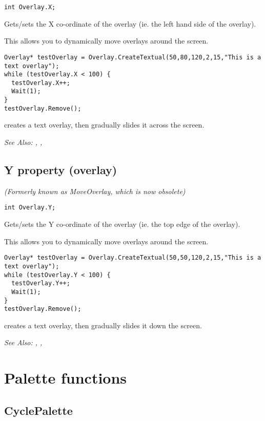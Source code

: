 \begin{verbatim}
int Overlay.X;
\end{verbatim}
Gets/sets the X co-ordinate of the overlay (ie. the left hand side of the overlay).

This allows you to dynamically move overlays around the screen.

\begin{verbatim}
Overlay* testOverlay = Overlay.CreateTextual(50,80,120,2,15,"This is a text overlay");
while (testOverlay.X < 100) {
  testOverlay.X++;
  Wait(1);
}
testOverlay.Remove();
\end{verbatim}
creates a text overlay, then gradually slides it across the screen.

\it{See Also:} ,
, 


\subsection{Y property (overlay)}\label{Overlay.Y}%

\it{(Formerly known as MoveOverlay, which is now obsolete)}

\begin{verbatim}
int Overlay.Y;
\end{verbatim}
Gets/sets the Y co-ordinate of the overlay (ie. the top edge of the overlay).

This allows you to dynamically move overlays around the screen.

\begin{verbatim}
Overlay* testOverlay = Overlay.CreateTextual(50,50,120,2,15,"This is a text overlay");
while (testOverlay.Y < 100) {
  testOverlay.Y++;
  Wait(1);
}
testOverlay.Remove();
\end{verbatim}
creates a text overlay, then gradually slides it down the screen.

\it{See Also:} ,
, 


\section{Palette functions}%

\subsection{CyclePalette}\label{CyclePalette}%

